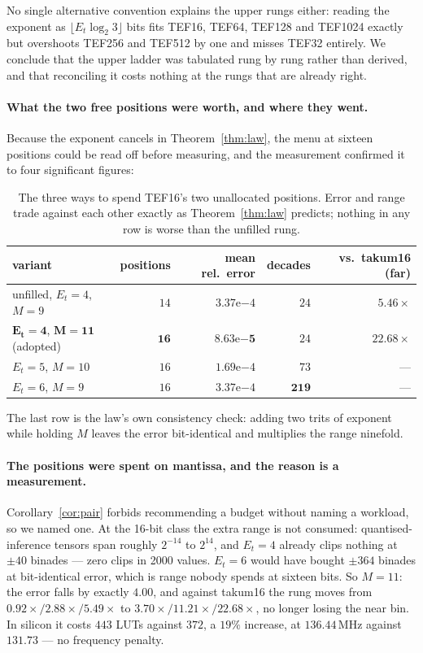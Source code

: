\documentclass[11pt]{article}
\theoremstyle{definition}
\begin{document}
No single alternative convention explains the upper rungs either: reading the
exponent as $\lfloor E_t\log_2 3\rfloor$ bits fits TEF16, TEF64, TEF128 and
TEF1024 exactly but overshoots TEF256 and TEF512 by one and misses TEF32
entirely. We conclude that the upper ladder was tabulated rung by rung rather than
derived, and that reconciling it costs nothing at the rungs that are already
right.

\paragraph{What the two free positions were worth, and where they went.} Because
the exponent cancels in Theorem~\ref{thm:law}, the menu at sixteen positions could
be read off before measuring, and the measurement confirmed it to four significant
figures:

\begin{table}[t]\centering
\caption{The three ways to spend TEF16's two unallocated positions. Error and
range trade against each other exactly as Theorem~\ref{thm:law} predicts; nothing
in any row is worse than the unfilled rung.}
\label{tab:tef16-fill}
\begin{tabular}{lrrrr}
\toprule
variant & positions & mean rel.\ error & decades & vs.\ takum16 (far) \\
\midrule
unfilled, $E_t{=}4$, $M{=}9$  & $14$ & $3.37\mathrm{e}{-4}$ & $24$  & $5.46\times$ \\
$\mathbf{E_t{=}4}$, $\mathbf{M{=}11}$ (adopted) & $\mathbf{16}$ & $\mathbf{8.63\mathrm{e}{-5}}$ & $24$ & $\mathbf{22.68\times}$ \\
$E_t{=}5$, $M{=}10$           & $16$ & $1.69\mathrm{e}{-4}$ & $73$  & --- \\
$E_t{=}6$, $M{=}9$            & $16$ & $3.37\mathrm{e}{-4}$ & $\mathbf{219}$ & --- \\
\bottomrule
\end{tabular}
\end{table}

The last row is the law's own consistency check: adding two trits of exponent
while holding $M$ leaves the error bit-identical and multiplies the range
ninefold.

\paragraph{The positions were spent on mantissa, and the reason is a measurement.}
Corollary~\ref{cor:pair} forbids recommending a budget without naming a workload,
so we named one. At the 16-bit class the extra range is not consumed:
quantised-inference tensors span roughly $2^{-14}$ to $2^{14}$, and $E_t = 4$
already clips nothing at $\pm 40$ binades --- zero clips in 2000 values. $E_t = 6$
would have bought $\pm 364$ binades at bit-identical error, which is range nobody
spends at sixteen bits. So $M = 11$: the error falls by exactly $4.00$, and
against takum16 the rung moves from $0.92\times / 2.88\times / 5.49\times$ to
$3.70\times / 11.21\times / 22.68\times$, no longer losing the near bin. In
silicon it costs $443$ LUTs against $372$, a $19\%$ increase, at $136.44$\,MHz
against $131.73$ --- no frequency penalty.
\end{document}
